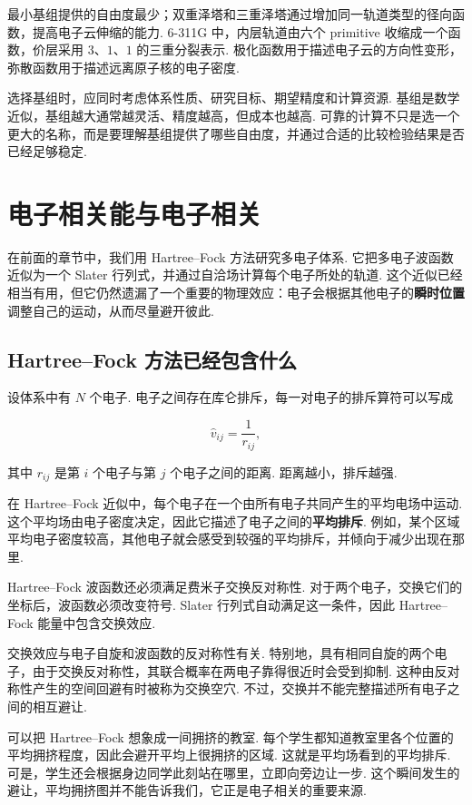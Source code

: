 \documentclass[UTF8,11pt,a4paper,openany]{ctexbook}
\begin{document}
最小基组提供的自由度最少；双重泽塔和三重泽塔通过增加同一轨道类型的径向函数，提高电子云伸缩的能力. 6-311G 中，内层轨道由六个 primitive 收缩成一个函数，价层采用 $3$、$1$、$1$ 的三重分裂表示. 极化函数用于描述电子云的方向性变形，弥散函数用于描述远离原子核的电子密度. 

选择基组时，应同时考虑体系性质、研究目标、期望精度和计算资源. 基组是数学近似，基组越大通常越灵活、精度越高，但成本也越高. 可靠的计算不只是选一个更大的名称，而是要理解基组提供了哪些自由度，并通过合适的比较检验结果是否已经足够稳定. 
\chapter{电子相关能与电子相关}

在前面的章节中，我们用 Hartree--Fock 方法研究多电子体系. 它把多电子波函数近似为一个 Slater 行列式，并通过自洽场计算每个电子所处的轨道. 这个近似已经相当有用，但它仍然遗漏了一个重要的物理效应：电子会根据其他电子的\textbf{瞬时位置}调整自己的运动，从而尽量避开彼此. 

\section{Hartree--Fock 方法已经包含什么}

设体系中有 $N$ 个电子. 电子之间存在库仑排斥，每一对电子的排斥算符可以写成

\[
\hat{v}_{ij}=\frac{1}{r_{ij}},
\]

其中 $r_{ij}$ 是第 $i$ 个电子与第 $j$ 个电子之间的距离. 距离越小，排斥越强. 

在 Hartree--Fock 近似中，每个电子在一个由所有电子共同产生的平均电场中运动. 这个平均场由电子密度决定，因此它描述了电子之间的\textbf{平均排斥}. 例如，某个区域平均电子密度较高，其他电子就会感受到较强的平均排斥，并倾向于减少出现在那里. 

Hartree--Fock 波函数还必须满足费米子交换反对称性. 对于两个电子，交换它们的坐标后，波函数必须改变符号. Slater 行列式自动满足这一条件，因此 Hartree--Fock 能量中包含交换效应. 

交换效应与电子自旋和波函数的反对称性有关. 特别地，具有相同自旋的两个电子，由于交换反对称性，其联合概率在两电子靠得很近时会受到抑制. 这种由反对称性产生的空间回避有时被称为交换空穴. 不过，交换并不能完整描述所有电子之间的相互避让. 

\begin{analogybox}
可以把 Hartree--Fock 想象成一间拥挤的教室. 每个学生都知道教室里各个位置的平均拥挤程度，因此会避开平均上很拥挤的区域. 这就是平均场看到的平均排斥. 可是，学生还会根据身边同学此刻站在哪里，立即向旁边让一步. 这个瞬间发生的避让，平均拥挤图并不能告诉我们，它正是电子相关的重要来源. 
\end{analogybox}
\end{document}
